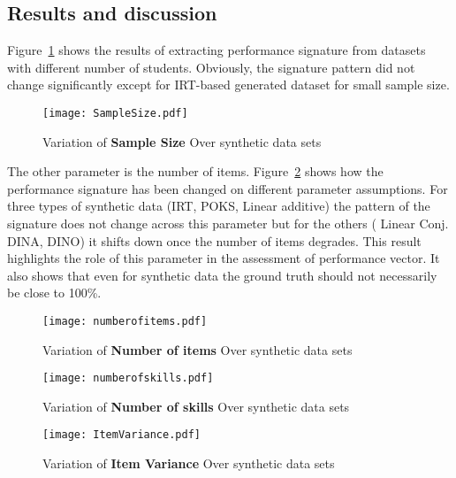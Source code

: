 \subsection{Results and discussion}

Figure~\ref{figSampleSize} shows the results of extracting performance signature from datasets with different number of students. Obviously, the signature pattern did not change significantly except for IRT-based generated dataset for small sample size. 

\begin{figure}
  \centering

    \texttt{[image: SampleSize.pdf]}
     \caption{Variation of \textbf{Sample Size} Over synthetic data sets}
\label{figSampleSize}
\end{figure}




The other parameter is the number of items. Figure~\ref{figNumberofItems} shows how the performance signature has been changed on different parameter assumptions. For three types of synthetic data (IRT, POKS, Linear additive) the pattern of the signature does not change across this parameter but for the others ( Linear Conj. DINA, DINO) it shifts down once the number of items degrades. This result highlights the role of this parameter in the assessment of performance vector. It also shows that even for synthetic data the ground truth should not necessarily be close to 100\%.

\begin{figure}
  \centering
    \texttt{[image: numberofitems.pdf]}
\caption{Variation of \textbf{Number of items} Over synthetic data sets}
\label{figNumberofItems}
\end{figure}

\begin{figure}
  \centering
    \texttt{[image: numberofskills.pdf]}
\caption{Variation of \textbf{Number of skills} Over synthetic data sets}
\label{figSkills}
\end{figure}

\begin{figure}
  \centering
    \texttt{[image: ItemVariance.pdf]}
\caption{Variation of \textbf{Item Variance} Over synthetic data sets}
\label{figitemVar}
\end{figure}

